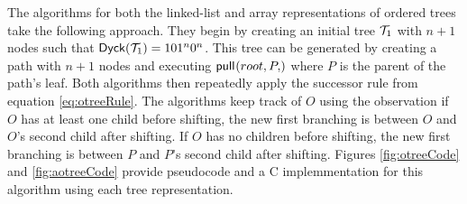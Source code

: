 The algorithms for both the linked-list and array representations of ordered trees take the following approach.  They begin by creating an initial tree $\mathcal{T}_1$ with $n+1$ nodes such that $\mathsf{Dyck}{(\mathcal{T}_1)}=101^{n}0^{n}$.  This tree can be generated by creating a path with $n+1$ nodes and executing $\pull{root,P}$ where $P$ is the parent of the path's leaf. Both algorithms then repeatedly apply the successor rule from equation \ref{eq:otreeRule}.  The algorithms keep track of $O$ using the observation if $O$ has at least one child before shifting, the new first branching is between $O$ and $O$'s second child after shifting.  If $O$ has no children before shifting, the new first branching is between $P$ and $P$'s second child after shifting. Figures \ref{fig:otreeCode} and \ref{fig:aotreeCode} provide pseudocode and a C implemmentation for this algorithm using each tree representation. 




